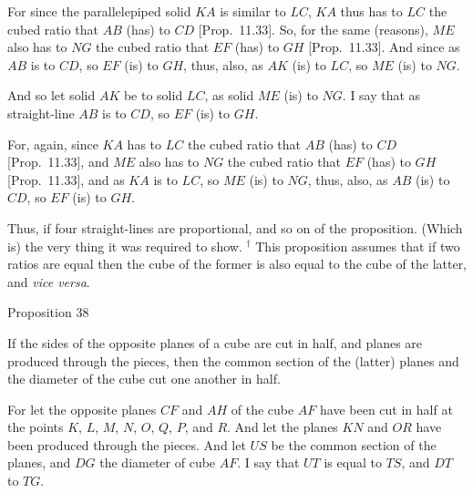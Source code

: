 For since the parallelepiped solid $KA$ is similar to $LC$, $KA$
thus has to $LC$ the cubed ratio that $AB$ (has) to $CD$ [Prop.~11.33]. So, for the same (reasons), $ME$ also has to
$NG$ the cubed ratio that $EF$ (has) to $GH$ [Prop.~11.33]. And since as $AB$
is to $CD$, so $EF$ (is) to $GH$, thus, also,  as $AK$ (is) to
$LC$, so $ME$ (is) to $NG$.

And so let solid $AK$ be to solid $LC$, as solid $ME$ (is) to $NG$.
I say that as straight-line $AB$ is to $CD$, so $EF$ (is) to $GH$.

For, again, since $KA$ has to $LC$ the cubed ratio that
$AB$ (has) to $CD$ [Prop.~11.33], and $ME$ also has to $NG$ the cubed ratio
that $EF$ (has) to $GH$ [Prop.~11.33], and as $KA$ is to $LC$, so $ME$
(is) to $NG$, thus, also, as $AB$ (is) to $CD$, so $EF$ (is) to $GH$.

Thus, if four straight-lines are proportional, and so on of
the proposition. (Which is) the very thing it was required to show.
{\footnotesize\noindent$^\dag$ This proposition assumes that if two
ratios are equal then the cube of the former is also equal to the cube of the
latter, and {\em vice versa}.}


\begin{center}
{\large Proposition 38}
\end{center}

If the sides of the opposite planes of a cube are cut in half, and planes are produced through the pieces, then the common section of the (latter) planes and the diameter of the cube cut one another in half.

\epsfysize=2.3in
\centerline{}

For let the opposite planes $CF$ and $AH$ of the cube $AF$ have been
cut in half at the points $K$, $L$, $M$, $N$, $O$, $Q$, $P$, and $R$. 
And let the planes $KN$ and $OR$ have been produced through the
pieces. And let $US$ be the common section of the planes, and
$DG$ the diameter of cube $AF$. I say that $UT$ is equal to $TS$, and
$DT$ to $TG$.

